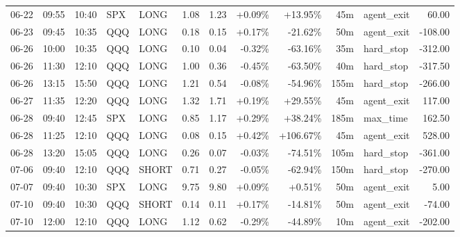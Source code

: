 \documentclass[11pt,a4paper,twoside]{article}
\begin{document}
\begin{center}
\begin{longtable}{>{\color{txtmain}}l l l l l r r r r r >{\color{txtmain}}l r}
06-22 & 09:55 & 10:40 & SPX & LONG & 1.08 & 1.23 & \textcolor{wingreen}{+0.09\%} & \textcolor{wingreen}{+13.95\%} & 45m & agent\_exit & \textcolor{wingreen}{60.00} \\
06-23 & 09:45 & 10:35 & QQQ & LONG & 0.18 & 0.15 & \textcolor{wingreen}{+0.17\%} & \textcolor{lossred}{-21.62\%} & 50m & agent\_exit & \textcolor{lossred}{-108.00} \\
06-26 & 10:00 & 10:35 & QQQ & LONG & 0.10 & 0.04 & \textcolor{lossred}{-0.32\%} & \textcolor{lossred}{-63.16\%} & 35m & hard\_stop & \textcolor{lossred}{-312.00} \\
06-26 & 11:30 & 12:10 & QQQ & LONG & 1.00 & 0.36 & \textcolor{lossred}{-0.45\%} & \textcolor{lossred}{-63.50\%} & 40m & hard\_stop & \textcolor{lossred}{-317.50} \\
06-26 & 13:15 & 15:50 & QQQ & LONG & 1.21 & 0.54 & \textcolor{lossred}{-0.08\%} & \textcolor{lossred}{-54.96\%} & 155m & hard\_stop & \textcolor{lossred}{-266.00} \\
06-27 & 11:35 & 12:20 & QQQ & LONG & 1.32 & 1.71 & \textcolor{wingreen}{+0.19\%} & \textcolor{wingreen}{+29.55\%} & 45m & agent\_exit & \textcolor{wingreen}{117.00} \\
06-28 & 09:40 & 12:45 & SPX & LONG & 0.85 & 1.17 & \textcolor{wingreen}{+0.29\%} & \textcolor{wingreen}{+38.24\%} & 185m & max\_time & \textcolor{wingreen}{162.50} \\
06-28 & 11:25 & 12:10 & QQQ & LONG & 0.08 & 0.15 & \textcolor{wingreen}{+0.42\%} & \textcolor{wingreen}{+106.67\%} & 45m & agent\_exit & \textcolor{wingreen}{528.00} \\
06-28 & 13:20 & 15:05 & QQQ & LONG & 0.26 & 0.07 & \textcolor{lossred}{-0.03\%} & \textcolor{lossred}{-74.51\%} & 105m & hard\_stop & \textcolor{lossred}{-361.00} \\
07-06 & 09:40 & 12:10 & QQQ & SHORT & 0.71 & 0.27 & \textcolor{lossred}{-0.05\%} & \textcolor{lossred}{-62.94\%} & 150m & hard\_stop & \textcolor{lossred}{-270.00} \\
07-07 & 09:40 & 10:30 & SPX & LONG & 9.75 & 9.80 & \textcolor{wingreen}{+0.09\%} & \textcolor{wingreen}{+0.51\%} & 50m & agent\_exit & \textcolor{wingreen}{5.00} \\
07-10 & 09:40 & 10:30 & QQQ & SHORT & 0.14 & 0.11 & \textcolor{wingreen}{+0.17\%} & \textcolor{lossred}{-14.81\%} & 50m & agent\_exit & \textcolor{lossred}{-74.00} \\
07-10 & 12:00 & 12:10 & QQQ & LONG & 1.12 & 0.62 & \textcolor{lossred}{-0.29\%} & \textcolor{lossred}{-44.89\%} & 10m & agent\_exit & \textcolor{lossred}{-202.00} \\

\end{longtable}
\end{center}
\end{document}
